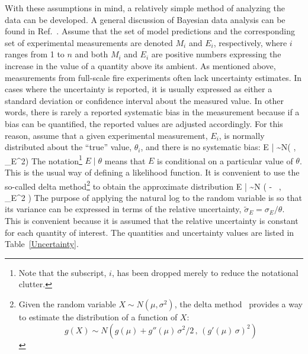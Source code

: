 With these assumptions in mind, a relatively simple method of analyzing the data can be developed.
A general discussion of Bayesian data analysis can be found in
Ref.~\cite{Gelman:Stats}.
Assume that the set of model predictions and the corresponding set of experimental measurements are denoted
$M_i$ and $E_i$, respectively, where $i$ ranges from 1 to $n$ and both $M_i$ and $E_i$ are positive numbers
expressing the increase in the value of a quantity above its ambient.
As mentioned above, measurements from full-scale fire experiments often lack uncertainty estimates. In cases where the uncertainty is
reported, it is usually expressed as either a standard deviation or confidence interval about the measured value. In other words, there is rarely
a reported systematic bias in the measurement because if a bias can be quantified, the reported values are adjusted accordingly.
For this reason, assume that a given experimental measurement, $E_i$, is normally
distributed about the ``true'' value, $\theta_i$, and there is no systematic bias:
\be
   E \; | \; \theta \sim N(\theta \; , \; \sigma_E^2) \label{expunc}
\ee
The notation\footnote{Note that the subscript, $i$, has been dropped merely to reduce the notational clutter.}
$E \; | \; \theta$ means that $E$ is conditional on a particular value of $\theta$.
This is the usual way of defining a likelihood function.
It is convenient to use the so-called delta method\footnote{Given the random variable $X \sim N(\mu,\sigma^2)$, the
delta method~\cite{Oehlert:1992} provides a way to estimate the distribution of a function of $X$:
$$g(X) \sim N \left( g(\mu) + g''(\mu) \, \sigma^2/2 \, , \, (g'(\mu) \, \sigma)^2\right)$$} to obtain the approximate distribution
\be
   \ln E \; | \; \theta \sim N \left( \ln \theta -  \, , \,\widetilde{\sigma}_E^2 \right) \label{eeq}
\ee
The purpose of applying the natural log to the random variable is so that its variance can be expressed in terms of the
relative uncertainty, $\widetilde{\sigma}_E=\sigma_E/\theta$. This is convenient because it is assumed that the relative
uncertainty is constant for each quantity of interest. The quantities and uncertainty values are listed in Table~\ref{Uncertainty}.

